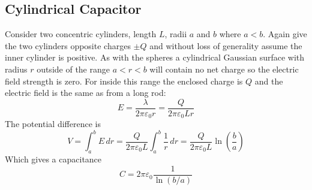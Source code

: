 \documentclass{article}
\begin{document}
    \subsection{Cylindrical Capacitor}\label{sec:cylindrical capacitor}
    Consider two concentric cylinders, length \(L\), radii \(a\) and \(b\) where \(a < b\).
    Again give the two cylinders opposite charges \(\pm Q\) and without loss of generality assume the inner cylinder is positive.
    As with the spheres a cylindrical Gaussian surface with radius \(r\) outside of the range \(a < r < b\) will contain no net charge so the electric field strength is zero.
    For inside this range the enclosed charge is \(Q\) and the electric field is the same as from a long rod:
    \[E = \frac{\lambda}{2\pi\varepsilon_0 r} = \frac{Q}{2\pi\varepsilon_0 Lr}\]
    The potential difference is
    \[V = \int_a^b E\,dr = \frac{Q}{2\pi\varepsilon_0 L}\int_a^b \frac{1}{r}\,dr = \frac{Q}{2\pi\varepsilon_0 L}\ln\left(\frac{b}{a}\right)\]
    Which gives a capacitance
    \[C = 2\pi\varepsilon_0\frac{1}{\ln(b/a)}\]
    
\end{document}
